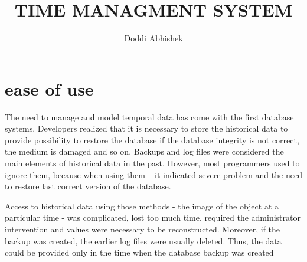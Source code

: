 \documentclass{article}
\title{TIME MANAGMENT SYSTEM}
\author{Doddi Abhishek}
\begin{document}
\maketitle



\section{ease of use}
The need to manage and model temporal data has come with the first database systems. Developers realized that it
is necessary to store the historical data to provide possibility to restore the database if the database integrity is not correct, the medium is damaged and so on. Backups and log files were considered the main elements of historical data
in the past. However, most programmers used to ignore them, because when using them – it indicated severe problem
and the need to restore last correct version of the database.
   
  Access to historical data using those methods - the image of
the object at a particular time - was complicated, lost too much time, required the administrator intervention and values
were necessary to be reconstructed. Moreover, if the backup was created, the earlier log files were usually deleted.
Thus, the data could be provided only in the time when the database backup was created
\end{document}
